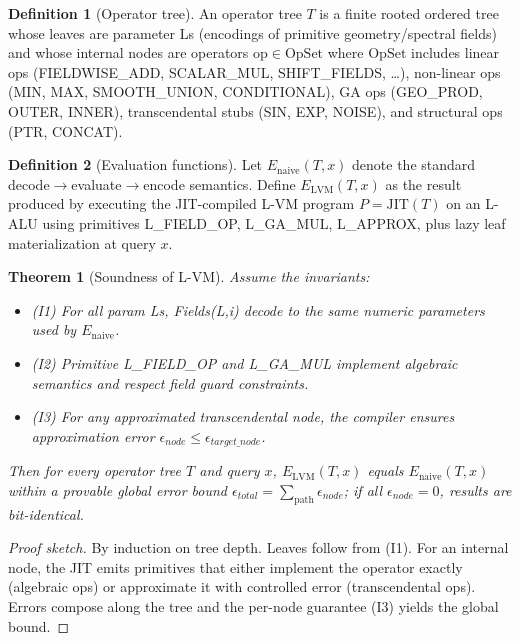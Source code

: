 \documentclass[11pt]{article}
\theoremstyle{definition}
\newtheorem{definition}{Definition}[section]
\theoremstyle{plain}
\newtheorem{theorem}{Theorem}[section]
\begin{document}
\begin{definition}[Operator tree]
An operator tree \(T\) is a finite rooted ordered tree whose leaves are parameter Ls (encodings of primitive geometry/spectral fields) and whose internal nodes are operators \(\mathrm{op}\in\mathrm{OpSet}\) where \(\mathrm{OpSet}\) includes linear ops (FIELDWISE\_ADD, SCALAR\_MUL, SHIFT\_FIELDS, \ldots), non-linear ops (MIN, MAX, SMOOTH\_UNION, CONDITIONAL), GA ops (GEO\_PROD, OUTER, INNER), transcendental stubs (SIN, EXP, NOISE), and structural ops (PTR, CONCAT).
\end{definition}

\begin{definition}[Evaluation functions]
Let \(E_{\mathrm{naive}}(T,x)\) denote the standard decode\(\to\)evaluate\(\to\)encode semantics. Define \(E_{\mathrm{LVM}}(T,x)\) as the result produced by executing the JIT-compiled L-VM program \(P=\mathrm{JIT}(T)\) on an L-ALU using primitives L\_FIELD\_OP, L\_GA\_MUL, L\_APPROX, plus lazy leaf materialization at query \(x\).
\end{definition}

\begin{theorem}[Soundness of L-VM]\label{thm:soundness}
Assume the invariants:
\begin{itemize}
  \item (I1) For all param Ls, Fields(L,i) decode to the same numeric parameters used by \(E_{\mathrm{naive}}\).
  \item (I2) Primitive L\_FIELD\_OP and L\_GA\_MUL implement algebraic semantics and respect field guard constraints.
  \item (I3) For any approximated transcendental node, the compiler ensures approximation error \(\epsilon_{node}\le\epsilon_{target\_node}\).
\end{itemize}
Then for every operator tree \(T\) and query \(x\), \(E_{\mathrm{LVM}}(T,x)\) equals \(E_{\mathrm{naive}}(T,x)\) within a provable global error bound \(\epsilon_{total}=\sum_{\text{path}}\epsilon_{node}\); if all \(\epsilon_{node}=0\), results are bit-identical.
\end{theorem}

\begin{proof}[Proof sketch]
By induction on tree depth. Leaves follow from (I1). For an internal node, the JIT emits primitives that either implement the operator exactly (algebraic ops) or approximate it with controlled error (transcendental ops). Errors compose along the tree and the per-node guarantee (I3) yields the global bound.
\end{proof}
\end{document}

